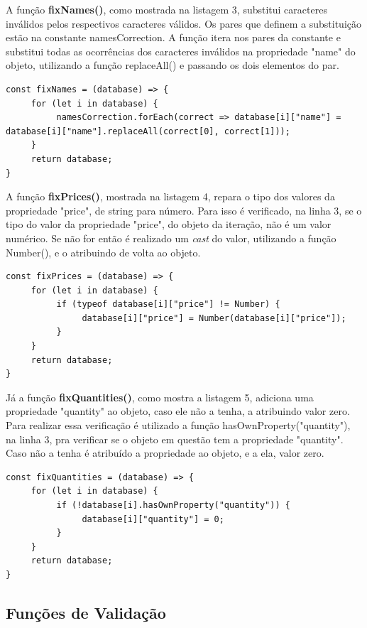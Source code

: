 \documentclass[12pt]{article}
\begin{document}
A função \textbf{fixNames()}, como mostrada na listagem 3, substitui caracteres inválidos pelos respectivos caracteres válidos. Os pares que definem a substituição estão na constante namesCorrection. A função itera nos pares da constante e substitui todas as ocorrências dos caracteres inválidos na propriedade "name" do objeto, utilizando a função replaceAll() e passando os dois elementos do par. 

\begin{lstlisting}[caption=Função fixNames()]
const fixNames = (database) => {
     for (let i in database) {
          namesCorrection.forEach(correct => database[i]["name"] = database[i]["name"].replaceAll(correct[0], correct[1]));
     }
     return database;
}
\end{lstlisting}

A função \textbf{fixPrices()}, mostrada na listagem 4, repara o tipo dos valores da propriedade "price", de string para número. Para isso é verificado, na linha 3, se o tipo do valor da propriedade "price", do objeto da iteração, não é um valor numérico. Se não for então é realizado um \textit{cast} do valor, utilizando a função Number(), e o atribuindo de volta ao objeto.

\begin{lstlisting}[caption=Função fixPrices()]
const fixPrices = (database) => {
     for (let i in database) {
          if (typeof database[i]["price"] != Number) {
               database[i]["price"] = Number(database[i]["price"]);
          }
     }
     return database;
}
\end{lstlisting}

Já a função \textbf{fixQuantities()}, como mostra a listagem 5, adiciona uma propriedade "quantity" ao objeto, caso ele não a tenha, a atribuindo valor zero. Para realizar essa verificação é utilizado a função hasOwnProperty("quantity"), na linha 3, pra verificar se o objeto em questão tem a propriedade "quantity". Caso não a tenha é atribuído a propriedade ao objeto, e a ela, valor zero. 

\begin{lstlisting}[caption=Função fixQuantities()]
const fixQuantities = (database) => {
     for (let i in database) {
          if (!database[i].hasOwnProperty("quantity")) {
               database[i]["quantity"] = 0;
          }
     }
     return database;
}
\end{lstlisting}

\subsection{Funções de Validação}
\end{document}
